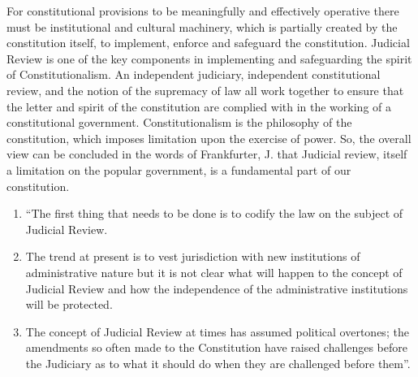 \begin{multicols}{2}
\vspace{-.1cm}

\noi
For constitutional provisions to be meaningfully and effectively operative there must be
institutional and cultural machinery, which is partially created by the constitution itself, to
implement, enforce and safeguard the constitution. Judicial Review is one of the key
components in implementing and safeguarding the spirit of Constitutionalism. An
independent judiciary, independent constitutional review, and the notion of the supremacy of
law all work together to ensure that the letter and spirit of the constitution are complied with
in the working of a constitutional government. Constitutionalism is the philosophy of the
constitution, which imposes limitation upon the exercise of power. So, the overall view can
be concluded in the words of Frankfurter, J. that Judicial review, itself a limitation on the
popular government, is a fundamental part of our constitution.



\vspace{-.2cm}

\noi
\begin{enumerate}
\itemsep=0pt

\item “The first thing that needs to be done is to codify the law on the subject of Judicial
Review.

\item The trend at present is to vest jurisdiction with new institutions of administrative
nature but it is not clear what will happen to the concept of Judicial Review and how
the independence of the administrative institutions will be protected.

\item The concept of Judicial Review at times has assumed political overtones; the
amendments so often made to the Constitution have raised challenges before the
Judiciary as to what it should do when they are challenged before them”.
\end{enumerate}

\end{multicols}
\label{end2020-art8}
